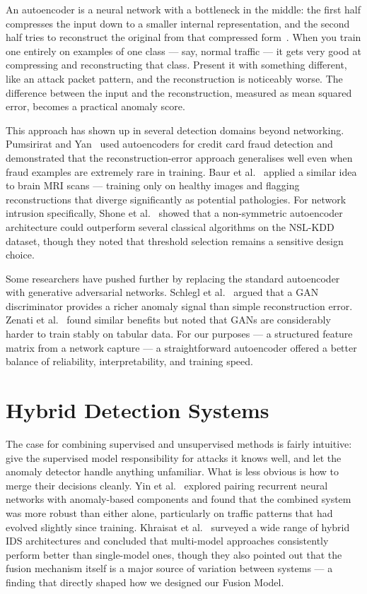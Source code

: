 \documentclass[12pt,a4paper]{report}
\begin{document}
An autoencoder is a neural network with a bottleneck in the middle: the first half
compresses the input down to a smaller internal representation, and the second half
tries to reconstruct the original from that compressed form~\cite{autoencoder_original}.
When you train one entirely on examples of one class — say, normal traffic — it gets
very good at compressing and reconstructing that class. Present it with something
different, like an attack packet pattern, and the reconstruction is noticeably worse.
The difference between the input and the reconstruction, measured as mean squared
error, becomes a practical anomaly score.

\noindent This approach has shown up in several detection domains beyond networking.
Pumsirirat and Yan~\cite{ae_fraud} used autoencoders for credit card fraud detection
and demonstrated that the reconstruction-error approach generalises well even when
fraud examples are extremely rare in training. Baur et al.~\cite{ae_medical} applied a
similar idea to brain MRI scans — training only on healthy images and flagging
reconstructions that diverge significantly as potential pathologies. For network
intrusion specifically, Shone et al.~\cite{ae_ids} showed that a non-symmetric
autoencoder architecture could outperform several classical algorithms on the NSL-KDD
dataset, though they noted that threshold selection remains a sensitive design choice.

\noindent Some researchers have pushed further by replacing the standard autoencoder
with generative adversarial networks. Schlegl et al.~\cite{ganomaly} argued that a GAN
discriminator provides a richer anomaly signal than simple reconstruction error.
Zenati et al.~\cite{efficient_gan} found similar benefits but noted that GANs are
considerably harder to train stably on tabular data. For our purposes — a structured
feature matrix from a network capture — a straightforward autoencoder offered a better
balance of reliability, interpretability, and training speed.

\section{Hybrid Detection Systems}

The case for combining supervised and unsupervised methods is fairly intuitive:
give the supervised model responsibility for attacks it knows well, and let the
anomaly detector handle anything unfamiliar. What is less obvious is how to merge
their decisions cleanly. Yin et al.~\cite{hybrid_ids} explored pairing recurrent neural
networks with anomaly-based components and found that the combined system was more
robust than either alone, particularly on traffic patterns that had evolved slightly
since training. Khraisat et al.~\cite{hybrid_survey} surveyed a wide range of hybrid
IDS architectures and concluded that multi-model approaches consistently perform better
than single-model ones, though they also pointed out that the fusion mechanism itself
is a major source of variation between systems — a finding that directly shaped how we
designed our Fusion Model.
\end{document}
